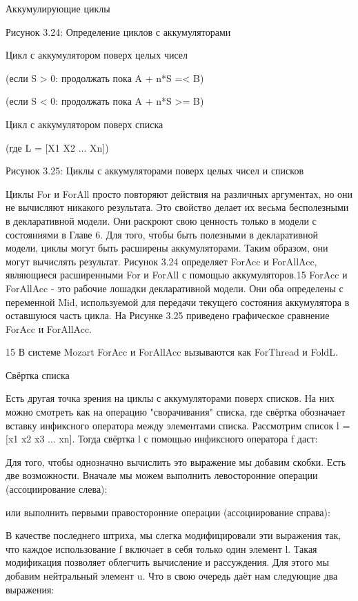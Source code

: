 Аккумулирующие циклы

Рисунок 3.24: Определение циклов с аккумуляторами

Цикл с аккумулятором поверх целых чисел

(если S > 0: продолжать пока A + n*S =< B)

(если S < 0: продолжать пока A + n*S >= B)

Цикл с аккумулятором поверх списка

(где L = [X1 X2 ... Xn])

Рисунок 3.25: Циклы с аккумуляторами поверх целых чисел и списков

Циклы For и ForAll просто повторяют действия на различных аргументах, но они не вычисляют никакого результата. Это свойство делает их весьма бесполезными в декларативной модели. Они раскроют свою ценность только в модели с состояниями в Главе 6. Для того, чтобы быть полезными в декларативной модели, циклы могут быть расширены аккумуляторами. Таким образом, они могут вычислять результат. Рисунок 3.24 определяет ForAcc и ForAllAcc, являющиеся расширенными For и ForAll с помощью аккумуляторов.15 ForAcc и ForAllAcc - это рабочие лошадки декларативной модели. Они оба определены с переменной Mid, используемой для передачи текущего состояния аккумулятора в оставшуюся часть цикла. На Рисунке 3.25 приведено графическое сравнение ForAcc и ForAllAcc.

15 В системе Mozart ForAcc и ForAllAcc вызываются как ForThread и FoldL.

Свёртка списка

Есть другая точка зрения на циклы с аккумуляторами поверх списков. На них можно смотреть как на операцию "сворачивания" списка, где свёртка обозначает вставку инфиксного оператора между элементами списка. Рассмотрим список l = [x1 x2 x3 ... xn]. Тогда свёртка l с помощью инфиксного оператора f даст:

Для того, чтобы однозначно вычислить это выражение мы добавим скобки. Есть две возможности. Вначале мы можем выполнить левосторонние операции (ассоциирование слева):

или выполнить первыми правосторонние операции (ассоциирование справа):

В качестве последнего штриха, мы слегка модифицировали эти выражения так, что каждое использование f включает в себя только один элемент l. Такая модификация позволяет облегчить вычисление и рассуждения. Для этого мы добавим нейтральный элемент u. Что в свою очередь даёт нам следующие два выражения:

